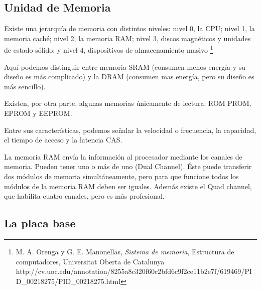 \documentclass{book}
\begin{document}
\subsection {\textbf{Unidad de Memoria}}

\begin{large}


    Existe una jerarquía de memoria con distintos niveles: nivel 0, la CPU; nivel 1, la memoria caché; nivel 2, la memoria RAM; nivel 3, discos magnéticos y unidades de estado sólido; y  nivel 4, dispositivos de almacenamiento masivo \footnote {\normalsize M. A. Orenga y G. E. Manonellas, \textit{Sistema de memoria}, Estructura de computadores, Universitat Oberta de Catalunya http://cv.uoc.edu/annotation/8255a8c320f60c2bfd6c9f2ce11b2e7f/619469/PID\_00218275/PID\_00218275.html}

    Aquí podemos distinguir entre memoria SRAM (consumen menos energía y su diseño es más complicado) y la DRAM (consumen mas energía, pero su diseño es más sencillo).

    Existen, por otra parte, algunas memorias únicamente de lectura: ROM PROM, EPROM y EEPROM.

    Entre sus características, podemos señalar la velocidad o frecuencia, la capacidad, el tiempo de acceso y la latencia CAS.

    La memoria RAM envía la información al procesador mediante los canales de memoria. Pueden tener uno o más de uno (Dual Channel). Éste puede transferir dos módulos de memoria simultáneamente, pero para que funcione todos los módulos de la memoria RAM deben ser iguales.
    Además existe el Quad channel, que habilita cuatro canales, pero es más profesional.

\end{large}

\subsection {\textbf {La placa base}}
\end{document}
